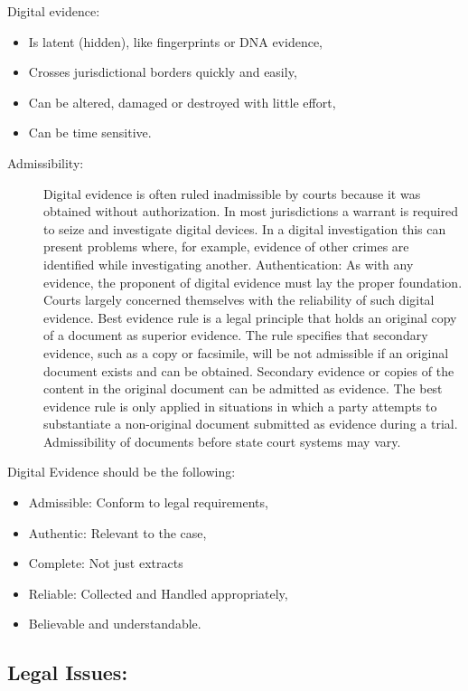 \documentclass[british]{article}
\begin{document}
Digital evidence:
\begin{itemize}
	\item Is latent (hidden), like fingerprints or DNA evidence,
	\item Crosses jurisdictional borders quickly and easily,
	\item Can be altered, damaged or destroyed with little effort,
	\item Can be time sensitive.
\end{itemize}
\begin{description}
	\item [{Admissibility:}] Digital evidence is often ruled inadmissible by
	      courts because it was obtained without authorization. In most jurisdictions
	      a warrant is required to seize and investigate digital devices. In
	      a digital investigation this can present problems where, for example,
	      evidence of other crimes are identified while investigating another.
	      Authentication: As with any evidence, the proponent of digital evidence
	      must lay the proper foundation. Courts largely concerned themselves
	      with the reliability of such digital evidence. Best evidence rule
	      is a legal principle that holds an original copy of a document as
	      superior evidence. The rule specifies that secondary evidence, such
	      as a copy or facsimile, will be not admissible if an original document
	      exists and can be obtained. \textquotedbl Secondary evidence\textquotedbl{}
	      or copies of the content in the original document can be admitted
	      as evidence. The best evidence rule is only applied in situations
	      in which a party attempts to substantiate a non-original document
	      submitted as evidence during a trial. Admissibility of documents before
	      state court systems may vary.
\end{description}
Digital Evidence should be the following:
\begin{itemize}
	\item Admissible: Conform to legal requirements,
	\item Authentic: Relevant to the case,
	\item Complete: Not just extracts
	\item Reliable: Collected and Handled appropriately,
	\item Believable and understandable.
\end{itemize}

\subsection{Legal Issues:}
\end{document}
